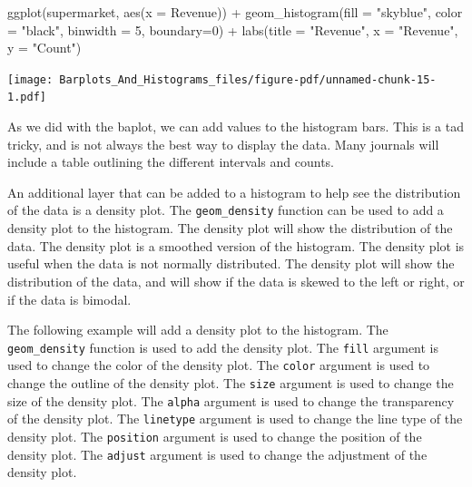 \documentclass[
  letterpaper,
  DIV=11,
  numbers=noendperiod]{scrreprt}
\newenvironment{Shaded}{\begin{snugshade}}{\end{snugshade}}
\newcommand{\AttributeTok}[1]{\textcolor[rgb]{0.40,0.45,0.13}{#1}}
\newcommand{\DecValTok}[1]{\textcolor[rgb]{0.68,0.00,0.00}{#1}}
\newcommand{\FunctionTok}[1]{\textcolor[rgb]{0.28,0.35,0.67}{#1}}
\newcommand{\NormalTok}[1]{\textcolor[rgb]{0.00,0.23,0.31}{#1}}
\newcommand{\SpecialCharTok}[1]{\textcolor[rgb]{0.37,0.37,0.37}{#1}}
\newcommand{\StringTok}[1]{\textcolor[rgb]{0.13,0.47,0.30}{#1}}
\begin{document}
\begin{Shaded}
\begin{Highlighting}[]
\FunctionTok{ggplot}\NormalTok{(supermarket, }\FunctionTok{aes}\NormalTok{(}\AttributeTok{x =} \StringTok{\textasciigrave{}}\AttributeTok{Revenue}\StringTok{\textasciigrave{}}\NormalTok{)) }\SpecialCharTok{+}
  \FunctionTok{geom\_histogram}\NormalTok{(}\AttributeTok{fill =} \StringTok{"skyblue"}\NormalTok{, }\AttributeTok{color =} \StringTok{"black"}\NormalTok{, }\AttributeTok{binwidth =} \DecValTok{5}\NormalTok{, }\AttributeTok{boundary=}\DecValTok{0}\NormalTok{) }\SpecialCharTok{+}
  \FunctionTok{labs}\NormalTok{(}\AttributeTok{title =} \StringTok{"Revenue"}\NormalTok{,}
       \AttributeTok{x =} \StringTok{"Revenue"}\NormalTok{,}
       \AttributeTok{y =} \StringTok{"Count"}\NormalTok{)}
\end{Highlighting}
\end{Shaded}

\texttt{[image: Barplots\_And\_Histograms\_files/figure-pdf/unnamed-chunk-15-1.pdf]}

As we did with the baplot, we can add values to the histogram bars. This
is a tad tricky, and is not always the best way to display the data.
Many journals will include a table outlining the different intervals and
counts.

An additional layer that can be added to a histogram to help see the
distribution of the data is a density plot. The \texttt{geom\_density}
function can be used to add a density plot to the histogram. The density
plot will show the distribution of the data. The density plot is a
smoothed version of the histogram. The density plot is useful when the
data is not normally distributed. The density plot will show the
distribution of the data, and will show if the data is skewed to the
left or right, or if the data is bimodal.

The following example will add a density plot to the histogram. The
\texttt{geom\_density} function is used to add the density plot. The
\texttt{fill} argument is used to change the color of the density plot.
The \texttt{color} argument is used to change the outline of the density
plot. The \texttt{size} argument is used to change the size of the
density plot. The \texttt{alpha} argument is used to change the
transparency of the density plot. The \texttt{linetype} argument is used
to change the line type of the density plot. The \texttt{position}
argument is used to change the position of the density plot. The
\texttt{adjust} argument is used to change the adjustment of the density
plot.
\end{document}
